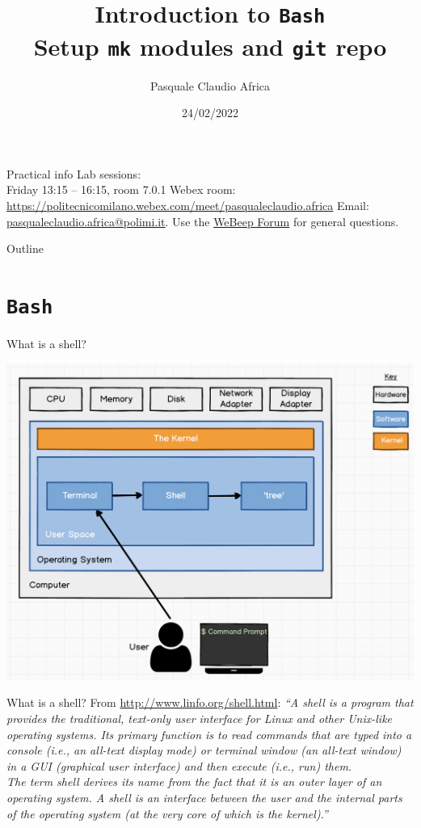 \documentclass{beamer}
\title{Introduction to \texttt{Bash}\\Setup \texttt{mk} modules and \texttt{git} repo}
\author{Pasquale Claudio Africa}
\institute{MOX\\ Dipartimento di Matematica\\
Politecnico di Milano}
\date{24/02/2022}
\begin{document}
\begin{frame}
    \titlepage
\end{frame}

\begin{frame}{Practical info}
    Lab sessions:\\
    Friday 13:15 -- 16:15, room 7.0.1
    \vfill
    Webex room: \\
    \url{https://politecnicomilano.webex.com/meet/pasqualeclaudio.africa}
    \vfill
    Email: \href{mailto:pasqualeclaudio.africa@polimi.it}{pasqualeclaudio.africa@polimi.it}.
    \vfill
    Use the \href{https://webeep.polimi.it/mod/forum/view.php?id=2521}{WeBeep Forum} for general questions.
\end{frame}

\begin{frame}{Outline}
    \tableofcontents
\end{frame}

\section{\texttt{Bash}}
\begin{frame}{What is a shell?}
    \begin{center}
        \includegraphics[width=\textwidth]{shell.png}
    \end{center}
\end{frame}

\begin{frame}{What is a shell?}
    From \url{http://www.linfo.org/shell.html}:
    \textit{``A shell is a program that provides the traditional, text-only user interface for Linux and other Unix-like operating systems. Its primary function is to read commands that are typed into a console (i.e., an all-text display mode) or terminal window (an all-text window) in a GUI (graphical user interface) and then execute (i.e., run) them.\\
    The term shell derives its name from the fact that it is an outer layer of an operating system. A shell is an interface between the user and the internal parts of the operating system (at the very core of which is the kernel).''}
\end{frame}
\end{document}
